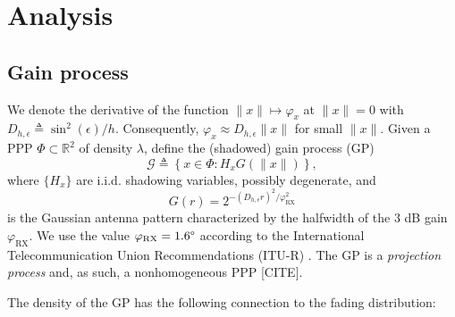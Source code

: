 \documentclass[conference]{IEEEtran}
\newcommand{\R}{\mathbb{R}}
\theoremstyle{definition}
\theoremstyle{plain}
\begin{document}
      
          \section{Analysis}

          \subsection{Gain process}
          We denote the derivative of the function $\|x\| \mapsto \varphi_x $ at $\|x\| =0$ with $D_{h,\epsilon} \triangleq \sin^2(\epsilon)/h$. Consequently, $\varphi_x \approx D_{h,\epsilon}\|x\|$ for small $\|x\|$.
          Given a PPP $\Phi \subset \R^2$ of density $\lambda$, define the (shadowed) gain process (GP)
          \begin{equation}
            \label{eq:gainprocess}
            \mathcal{G} \triangleq \left\{x \in \Phi : H_x G(\|x\|) \right\},
          \end{equation}
          where $\{H_x\}$ are i.i.d. shadowing variables, possibly degenerate, and 
          \begin{equation}
            G(r) = 2^{-(D_{h,\epsilon}r)^2/\varphi^2_{\text{RX}}}
          \end{equation}
          is the Gaussian antenna pattern characterized by the halfwidth of the $3$ dB gain $\varphi_{\text{RX}}$. We use the value $\varphi_{\text{RX}} = 1.6 \degree$ according to the International Telecommunication Union Recommendations (ITU-R) \cite{ITURS1528}. The GP is a \textit{projection process} and, as such, a nonhomogeneous PPP [CITE].

            The density of the GP has the following connection to the fading distribution:
\end{document}
